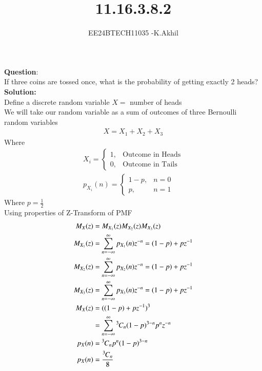 \documentclass[journal]{IEEEtran}
\begin{document}

\vspace{3cm}

\title{11.16.3.8.2}
\author{EE24BTECH11035 -K.Akhil}
\maketitle

\renewcommand{\thefigure}{\theenumi}
\renewcommand{\thetable}{\theenumi}
\setlength{\intextsep}{10pt} %

\renewcommand{\thetable}{\theenumi}

\textbf{Question}:\\
If three coins are tossed once, what is the probability of getting exactly 2 heads?\\
\textbf{Solution: }\\
Define a discrete random variable $X = $ number of heads\\
We will take our random variable as a sum of outcomes of three Bernoulli random variables
\begin{align}
    X = X_1+X_2+X_3
\end{align}
Where
\begin{align}
X_i = 
\begin{cases}
    1, & \text{Outcome in Heads}\\
    0, & \text{Outcome in Tails}
\end{cases}\\
p_{X_i}(n) = 
\begin{cases}
    1-p, & n = 0\\
    p, & n = 1
\end{cases}
\end{align}
Where $p=\frac{1}{2}$\\
Using properties of Z-Transform of PMF
\begin{align}
    M_X(z) &= M_{X_1}(z)M_{X_2}(z)M_{X_3}(z)\\
    M_{X_1}(z) &= \sum_{n=-\infty}^{\infty}p_{X_1}(n)z^{-n} = (1-p)+pz^{-1}\\
    M_{X_2}(z) &= \sum_{n=-\infty}^{\infty}p_{X_2}(n)z^{-n} = (1-p)+pz^{-1}\\
    M_{X_3}(z) &= \sum_{n=-\infty}^{\infty}p_{X_3}(n)z^{-n} = (1-p)+pz^{-1}\\
    M_X(z) &= ((1-p)+pz^{-1})^3\\
     &= \sum_{n=-\infty}^{\infty}{{}^{3}\mkern-1muC_{n}}(1-p)^{3-n}p^nz^{-n}\\
    p_{X}(n) &= {{}^{3}\mkern-1muC_{n}}p^{n}(1-p)^{3-n}\\
    p_{X}(n) &= \frac{{{}^{3}\mkern-1muC_{n}}}{8}
\end{align}
\end{document}
